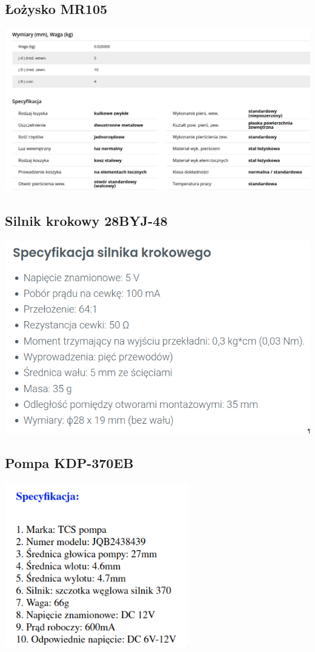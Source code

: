\documentclass[a4paper,12pt, openany]{article}
\begin{document}
\subsection{Łożysko MR105}
\includegraphics[width=\textwidth]{mr105.png}

\subsection{Silnik krokowy 28BYJ-48}
\includegraphics[width=\textwidth]{silnikkrokowy.png}

\subsection{Pompa KDP-370EB}
\includegraphics[width=0.6\textwidth]{pompa.png}
\end{document}
